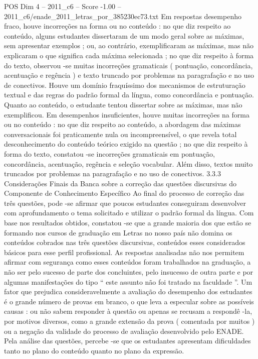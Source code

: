 \begin{textsample}{POS Dim 4 – 2011\_c6 – Score -1.00 – 2011\_c6/enade\_2011\_letras\_por\_385230ec73.txt}
Em respostas desempenho fraco, houve incorreções na forma ou no conteúdo : no que diz respeito ao conteúdo, alguns estudantes dissertaram de um modo geral sobre as máximas, sem apresentar exemplos ; ou, ao contrário, exemplificaram as máximas, mas não explicaram o que significa cada máxima selecionada ; no que diz respeito à forma do texto, observou -se muitas incorreções gramaticais ( pontuação, concordância, acentuação e regência ) e texto truncado por problemas na paragrafação e no uso de conectivos.
Houve um domínio fraquíssimo dos mecanismos de estruturação textual e das regras do padrão formal da língua, como concordância e pontuação.
Quanto ao conteúdo, o estudante tentou dissertar sobre as máximas, mas não exemplificou.
Em desempenhos insuficientes, houve muitas incorreções na forma ou no conteúdo : no que diz respeito ao conteúdo, a abordagem das máximas conversacionais foi praticamente nula ou incompreensível, o que revela total desconhecimento do conteúdo teórico exigido na questão ; no que diz respeito à forma do texto, constatou -se incorreções gramaticais em pontuação, concordância, acentuação, regência e seleção vocabular.
Além disso, textos muito truncados por problemas na paragrafação e no uso de conectivos. 3.3.3 Considerações Finais da Banca sobre a correção das questões discursivas do Componente de Conhecimento Específico Ao final do processo de correção das três questões, pode -se afirmar que poucos estudantes conseguiram desenvolver com aprofundamento o tema solicitado e utilizar o padrão formal da língua.
Com base nos resultados obtidos, constatou -se que a grande maioria dos que estão se formando nos cursos de graduação em Letras no nosso país não domina os conteúdos cobrados nas três questões discursivas, conteúdos esses considerados básicos para esse perfil profissional.
As respostas analisadas não nos permitem afirmar com segurança como esses conteúdos foram trabalhados na graduação, a não ser pelo sucesso de parte dos concluintes, pelo insucesso de outra parte e por algumas manifestações do tipo “ este assunto não foi tratado na faculdade ”.
Um fator que prejudica consideravelmente a avaliação do desempenho dos estudantes é o grande número de provas em branco, o que leva a especular sobre as possíveis causas : ou não sabem responder à questão ou apenas se recusam a respondê -la, por motivos diversos, como a grande extensão da prova ( comentada por muitos ) ou a negação da validade do processo de avaliação desenvolvido pelo ENADE.
Pela análise das questões, percebe -se que os estudantes apresentam dificuldades tanto no plano do conteúdo quanto no plano da expressão.

\end{textsample}
